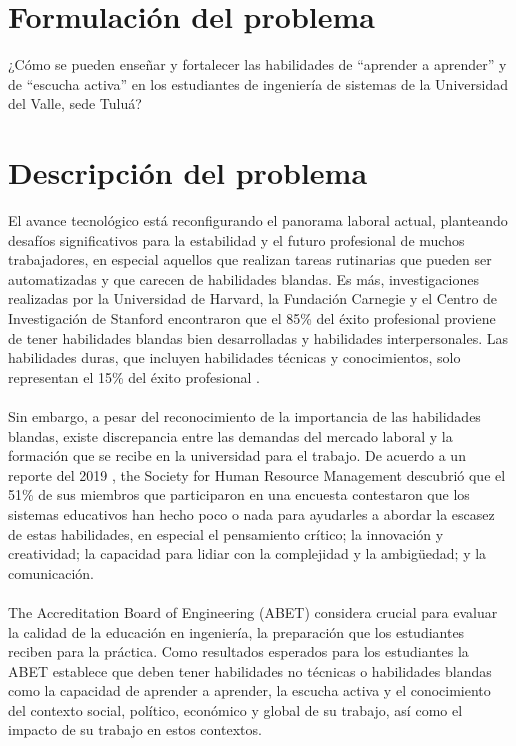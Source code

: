 \section{Formulación del problema}
¿Cómo se pueden enseñar y fortalecer las habilidades de “aprender a aprender” y de “escucha activa” en los estudiantes de ingeniería de sistemas de la Universidad del Valle, sede Tuluá?


\section{Descripción del problema}
El avance tecnológico está reconfigurando el panorama laboral actual, planteando desafíos significativos para la estabilidad y el futuro profesional de muchos trabajadores, en especial aquellos que realizan tareas rutinarias que pueden ser automatizadas y que carecen de habilidades blandas. Es más, investigaciones realizadas por la Universidad de Harvard, la Fundación Carnegie y el Centro de Investigación de Stanford encontraron que el 85\% del éxito profesional proviene de tener habilidades blandas bien desarrolladas y habilidades interpersonales. Las habilidades duras, que incluyen habilidades técnicas y conocimientos, solo representan el 15\% del éxito profesional \cite{NationalSoftSkills2024}.
\\
\\
Sin embargo, a pesar del reconocimiento de la importancia de las habilidades blandas, existe discrepancia entre las demandas del mercado laboral y la formación que se recibe en la universidad para el trabajo. De acuerdo a un reporte del 2019 \cite{Wilkie2019}, the Society for Human Resource Management descubrió que el 51\% de sus miembros que participaron en una encuesta contestaron que los sistemas educativos han hecho poco o nada para ayudarles a abordar la escasez de estas habilidades, en especial el pensamiento crítico; la innovación y creatividad; la capacidad para lidiar con la complejidad y la ambigüedad; y la comunicación.
\\
\\
The Accreditation Board of Engineering (ABET) \cite{ABET2021} considera crucial para evaluar la calidad de la educación en ingeniería, la preparación que los estudiantes reciben para la práctica. Como resultados esperados para los estudiantes la ABET establece que deben tener habilidades no técnicas o habilidades blandas como la capacidad de aprender a aprender, la escucha activa y el conocimiento del contexto social, político, económico y global de su trabajo, así como el impacto de su trabajo en estos contextos.
